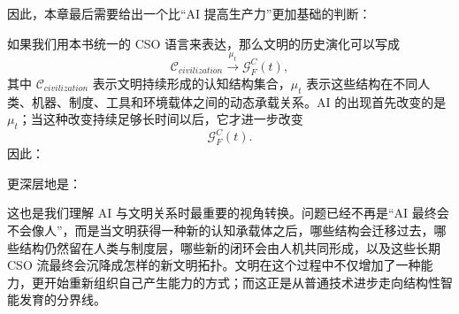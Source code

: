 因此，本章最后需要给出一个比“AI 提高生产力”更加基础的判断：

\begin{statementbox}
\centering
{}
\end{statementbox}

如果我们用本书统一的 CSO 语言来表达，那么文明的历史演化可以写成
\begin{equation}
\mathcal{C}_{civilization}
\xrightarrow{\mu_t}
\mathcal{G}^{C}_{F}(t),
\end{equation}
其中 $\mathcal{C}_{civilization}$ 表示文明持续形成的认知结构集合，$\mu_t$ 表示这些结构在不同人类、机器、制度、工具和环境载体之间的动态承载关系。AI 的出现首先改变的是 $\mu_t$；当这种改变持续足够长时间以后，它才进一步改变
\begin{equation}
\mathcal{G}^{C}_{F}(t).
\end{equation}
因此：
\begin{statementbox}
\centering
{}
\end{statementbox}
更深层地是：
\begin{statementbox}
\centering
{}
\end{statementbox}

这也是我们理解 AI 与文明关系时最重要的视角转换。问题已经不再是“AI 最终会不会像人”，而是当文明获得一种新的认知承载体之后，哪些结构会迁移过去，哪些结构仍然留在人类与制度层，哪些新的闭环会由人机共同形成，以及这些长期 CSO 流最终会沉降成怎样的新文明拓扑。文明在这个过程中不仅增加了一种能力，更开始重新组织自己产生能力的方式；而这正是从普通技术进步走向结构性智能发育的分界线。
